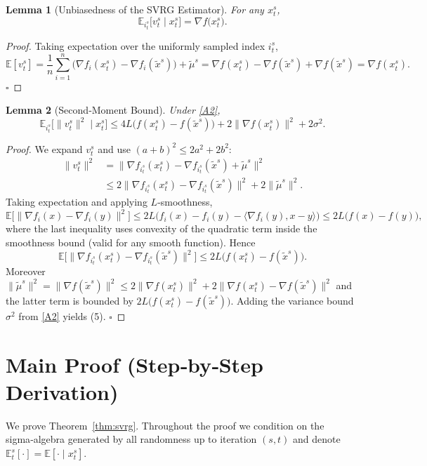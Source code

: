 \documentclass{article}
\newtheorem{lemma}{Lemma}
\begin{document}
\begin{lemma}[Unbiasedness of the SVRG Estimator]\label{lem:unbiased}
For any $x_{t}^{s}$,
\[
\mathbb{E}_{i_t^{s}}\!\big[v_{t}^{s}\mid x_{t}^{s}\big]=\nabla f\!\big(x_{t}^{s}\big).
\tag{4}
\]
\end{lemma}
\begin{proof}
Taking expectation over the uniformly sampled index $i_t^{s}$,
\[
\mathbb{E}[v_{t}^{s}]
= \frac{1}{n}\sum_{i=1}^{n}\big(\nabla f_i(x_{t}^{s})-\nabla f_i(\tilde{x}^{s})\big)+\tilde{\mu}^{s}
= \nabla f(x_{t}^{s})-\nabla f(\tilde{x}^{s})+\nabla f(\tilde{x}^{s})
= \nabla f(x_{t}^{s}).
\] \hfill $\square$
\end{proof}

\begin{lemma}[Second‑Moment Bound]\label{lem:variance}
Under \ref{A2},
\[
\mathbb{E}_{i_t^{s}}\!\big[\|v_{t}^{s}\|^{2}\mid x_{t}^{s}\big]
\le 4L\big(f(x_{t}^{s})-f(\tilde{x}^{s})\big)+2\|\nabla f(x_{t}^{s})\|^{2}+2\sigma^{2}.
\tag{5}
\]
\end{lemma}
\begin{proof}
We expand $v_{t}^{s}$ and use $(a+b)^{2}\le2a^{2}+2b^{2}$:
\[
\begin{aligned}
\|v_{t}^{s}\|^{2}
&=\big\|\nabla f_{i_t^{s}}(x_{t}^{s})-\nabla f_{i_t^{s}}(\tilde{x}^{s})+\tilde{\mu}^{s}\big\|^{2}\\
&\le 2\big\|\nabla f_{i_t^{s}}(x_{t}^{s})-\nabla f_{i_t^{s}}(\tilde{x}^{s})\big\|^{2}
   +2\|\tilde{\mu}^{s}\|^{2}.
\end{aligned}
\]
Taking expectation and applying $L$‑smoothness,
\[
\mathbb{E}\big[\|\nabla f_{i}(x)-\nabla f_{i}(y)\|^{2}\big]
\le 2L\big(f_i(x)-f_i(y)-\langle\nabla f_i(y),x-y\rangle\big)
\le 2L\big(f(x)-f(y)\big),
\]
where the last inequality uses convexity of the quadratic term inside the smoothness bound (valid for any smooth function). Hence
\[
\mathbb{E}\big[\|\nabla f_{i_t^{s}}(x_{t}^{s})-\nabla f_{i_t^{s}}(\tilde{x}^{s})\|^{2}\big]
\le 2L\big(f(x_{t}^{s})-f(\tilde{x}^{s})\big).
\]
Moreover $\|\tilde{\mu}^{s}\|^{2}=\|\nabla f(\tilde{x}^{s})\|^{2}\le2\|\nabla f(x_{t}^{s})\|^{2}+2\|\nabla f(x_{t}^{s})-\nabla f(\tilde{x}^{s})\|^{2}$ and the latter term is bounded by $2L\big(f(x_{t}^{s})-f(\tilde{x}^{s})\big)$. Adding the variance bound $\sigma^{2}$ from \ref{A2} yields (5). \hfill $\square$
\end{proof}

\section*{Main Proof (Step‑by‑Step Derivation)}
We prove Theorem~\ref{thm:svrg}. Throughout the proof we condition on the sigma‑algebra generated by all randomness up to iteration $(s,t)$ and denote $\mathbb{E}_{t}^{s}[\cdot]=\mathbb{E}[\cdot\mid x_{t}^{s}]$.
\end{document}
